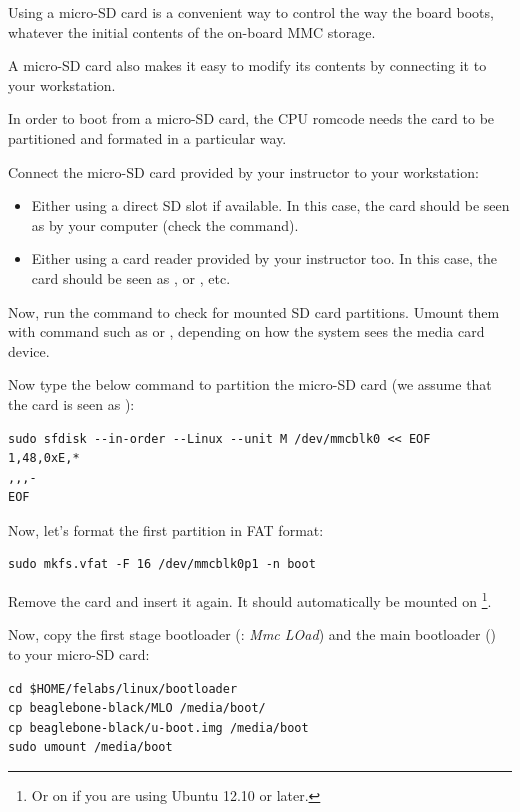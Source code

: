 Using a micro-SD card is a convenient way to control the way
the board boots, whatever the initial contents of the on-board MMC
storage.

A micro-SD card also makes it easy to modify its contents by connecting
it to your workstation.

In order to boot from a micro-SD card, the CPU romcode needs the card
to be partitioned and formated in a particular way.

Connect the micro-SD card provided by your instructor to your
workstation:

\begin{itemize}
\item Either using a direct SD slot if available.
      In this case, the card should be seen as  by
      your computer (check the  command).
\item Either using a card reader provided by your instructor too.
      In this case, the card should be seen as , or
      , etc.
\end{itemize}

Now, run the  command to check for mounted SD card
partitions. Umount them with command such as  or , depending on how
the system sees the media card device.

Now type the below command to partition the micro-SD card
(we assume that the card is seen as ):

\begin{verbatim}
sudo sfdisk --in-order --Linux --unit M /dev/mmcblk0 << EOF
1,48,0xE,*
,,,-
EOF
\end{verbatim}

Now, let's format the first partition in FAT format:

\begin{verbatim}
sudo mkfs.vfat -F 16 /dev/mmcblk0p1 -n boot
\end{verbatim}

Remove the card and insert it again. It should automatically be mounted
on  \footnote{Or on  if you
are using Ubuntu 12.10 or later.}.

Now, copy the first stage bootloader (: {\em Mmc LOad}) and the main
bootloader () to your micro-SD card:

\begin{verbatim}
cd $HOME/felabs/linux/bootloader
cp beaglebone-black/MLO /media/boot/
cp beaglebone-black/u-boot.img /media/boot
sudo umount /media/boot
\end{verbatim}

